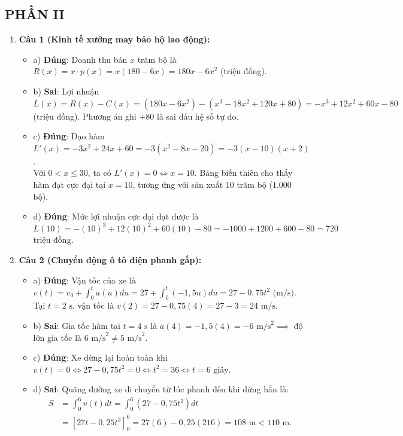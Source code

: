 \documentclass[12pt,a4paper]{article}
\begin{document}
\subsection*{PHẦN II}
\begin{enumerate}[label=\textbf{Câu \arabic*:}, leftmargin=*]
\item \textbf{Câu 1 (Kinh tế xưởng may bảo hộ lao động):}
\begin{itemize}
    \item a) \textbf{Đúng}: Doanh thu bán $x$ trăm bộ là $R(x) = x \cdot p(x) = x(180 - 6x) = 180x - 6x^2$ (triệu đồng).
    \item b) \textbf{Sai}: Lợi nhuận $L(x) = R(x) - C(x) = (180x - 6x^2) - (x^3 - 18x^2 + 120x + 80) = -x^3 + 12x^2 + 60x - 80$ (triệu đồng). Phương án ghi $+80$ là sai dấu hệ số tự do.
    \item c) \textbf{Đúng}: Đạo hàm $L'(x) = -3x^2 + 24x + 60 = -3(x^2 - 8x - 20) = -3(x - 10)(x + 2)$.\\
    Với $0 < x \le 30$, ta có $L'(x) = 0 \iff x = 10$. Bảng biến thiên cho thấy hàm đạt cực đại tại $x = 10$, tương ứng với sản xuất $10$ trăm bộ ($1.000$ bộ).
    \item d) \textbf{Đúng}: Mức lợi nhuận cực đại đạt được là $L(10) = -(10)^3 + 12(10)^2 + 60(10) - 80 = -1000 + 1200 + 600 - 80 = 720$ triệu đồng.
\end{itemize}

\item \textbf{Câu 2 (Chuyển động ô tô điện phanh gấp):}
\begin{itemize}
    \item a) \textbf{Đúng}: Vận tốc của xe là $v(t) = v_0 + \int_0^t a(u) du = 27 + \int_0^t (-1{,}5u) du = 27 - 0{,}75t^2\text{ (m/s)}$.\\
    Tại $t = 2\text{ s}$, vận tốc là $v(2) = 27 - 0{,}75(4) = 27 - 3 = 24\text{ m/s}$.
    \item b) \textbf{Sai}: Gia tốc hãm tại $t = 4\text{ s}$ là $a(4) = -1{,}5(4) = -6\text{ m/s}^2 \implies$ độ lớn gia tốc là $6\text{ m/s}^2 \ne 5\text{ m/s}^2$.
    \item c) \textbf{Đúng}: Xe dừng lại hoàn toàn khi $v(t) = 0 \iff 27 - 0{,}75t^2 = 0 \iff t^2 = 36 \iff t = 6\text{ giây}$.
    \item d) \textbf{Sai}: Quãng đường xe di chuyển từ lúc phanh đến khi dừng hẳn là:
    \begin{align*}
    S &= \int_0^6 v(t) dt = \int_0^6 (27 - 0{,}75t^2) dt \\
    &= \left[ 27t - 0{,}25t^3 \right]_0^6 = 27(6) - 0{,}25(216) = 108\text{ m} < 110\text{ m}.
    \end{align*}
\end{itemize}


\end{enumerate}
\end{document}
